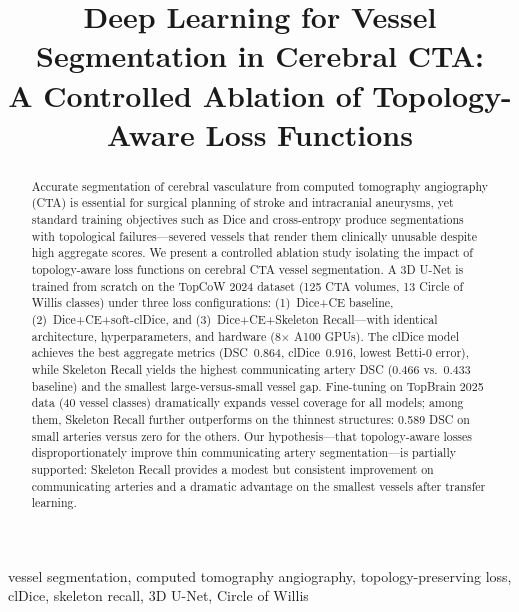\documentclass[conference]{IEEEtran}
\begin{document}
\title{Deep Learning for Vessel Segmentation in Cerebral CTA:\\A Controlled Ablation of Topology-Aware Loss Functions}

\author{
}

\maketitle

\begin{abstract}
Accurate segmentation of cerebral vasculature from computed tomography angiography (CTA) is essential for surgical planning of stroke and intracranial aneurysms, yet standard training objectives such as Dice and cross-entropy produce segmentations with topological failures---severed vessels that render them clinically unusable despite high aggregate scores. We present a controlled ablation study isolating the impact of topology-aware loss functions on cerebral CTA vessel segmentation. A 3D U-Net is trained from scratch on the TopCoW 2024 dataset (125 CTA volumes, 13 Circle of Willis classes) under three loss configurations: (1)~Dice+CE baseline, (2)~Dice+CE+soft-clDice, and (3)~Dice+CE+Skeleton Recall---with identical architecture, hyperparameters, and hardware (8$\times$ A100 GPUs). The clDice model achieves the best aggregate metrics (DSC~0.864, clDice~0.916, lowest Betti-0 error), while Skeleton Recall yields the highest communicating artery DSC (0.466 vs.\ 0.433 baseline) and the smallest large-versus-small vessel gap. Fine-tuning on TopBrain 2025 data (40 vessel classes) dramatically expands vessel coverage for all models; among them, Skeleton Recall further outperforms on the thinnest structures: 0.589 DSC on small arteries versus zero for the others. Our hypothesis---that topology-aware losses disproportionately improve thin communicating artery segmentation---is partially supported: Skeleton Recall provides a modest but consistent improvement on communicating arteries and a dramatic advantage on the smallest vessels after transfer learning.
\end{abstract}

\begin{IEEEkeywords}
vessel segmentation, computed tomography angiography, topology-preserving loss, clDice, skeleton recall, 3D U-Net, Circle of Willis
\end{IEEEkeywords}
\end{document}
